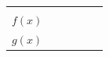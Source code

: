 {\begin{tabular}[t]{|l|l|l|l|l|l|}
         &
     \tabularnewline\cline{1-1}\cline{2-2}\cline{3-3}\cline{4-4}\cline{5-5}\cline{6-6}
                  $f\left(x\right)$
                 &
         &
         &
         &
         &
     \tabularnewline\cline{1-1}\cline{2-2}\cline{3-3}\cline{4-4}\cline{5-5}\cline{6-6}
                  $g\left(x\right)$
                 &
         &
         &

\end{tabular}}
